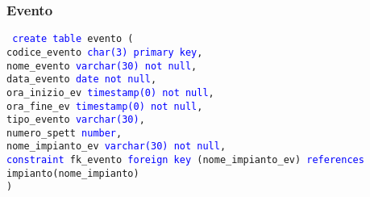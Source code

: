 \documentclass{article}
\begin{document}
    \subsubsection{Evento}
    \begin{flushleft}
        \texttt{
        \textcolor{blue}{create table} evento ( \\
        \hspace*{2em} codice\_evento \hspace*{3.3em} \textcolor{blue}{char(3)} \hspace*{4.1em} \textcolor{blue}{primary key}, \\
        \hspace*{2em} nome\_evento \hspace*{4.4em} \textcolor{blue}{varchar(30)} \hspace*{2em} \textcolor{blue}{not null}, \\
        \hspace*{2em} data\_evento \hspace*{4.4em} \textcolor{blue}{date} \hspace*{5.5em} \textcolor{blue}{not null}, \\
        \hspace*{2em} ora\_inizio\_ev \hspace*{3.5em} \textcolor{blue}{timestamp(0)} \hspace*{1.5em} \textcolor{blue}{not null}, \\
        \hspace*{2em} ora\_fine\_ev \hspace*{4.5em} \textcolor{blue}{timestamp(0)} \hspace*{1.5em} \textcolor{blue}{not null}, \\
        \hspace*{2em} tipo\_evento \hspace*{4.5em} \textcolor{blue}{varchar(30)}, \\
        \hspace*{2em} numero\_spett \hspace*{4em} \textcolor{blue}{number}, \\
        \hspace*{2em} nome\_impianto\_ev \hspace*{2.3em} \textcolor{blue}{varchar(30)} \hspace*{1.8em} \textcolor{blue}{not null}, \\
        \hspace*{2em} \textcolor{blue}{constraint} fk\_evento \textcolor{blue}{foreign key} (nome\_impianto\_ev) \textcolor{blue}{references} \hspace*{2em} impianto(nome\_impianto) \\)}
    \end{flushleft}
\end{document}
